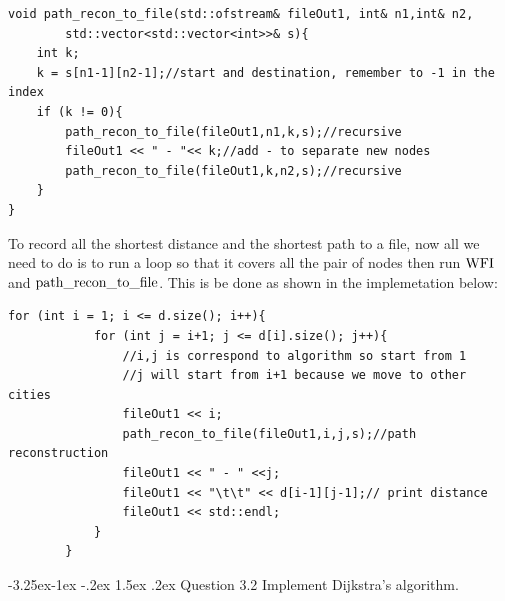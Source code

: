 \documentclass[a4paper,12pt]{article}%
\makeatletter
\renewcommand\subsection{\@startsection{subsection}{2}{\z@}%
                                     {-3.25ex\@plus -1ex \@minus -.2ex}%
                                     {1.5ex \@plus .2ex}%
                                     {\normalfont\bfseries}}
\makeatother
\begin{document}
\begin{lstlisting}[title = $\lstinline{path_recon_to_file}$]
void path_recon_to_file(std::ofstream& fileOut1, int& n1,int& n2, 
        std::vector<std::vector<int>>& s){
    int k;
    k = s[n1-1][n2-1];//start and destination, remember to -1 in the index
    if (k != 0){
        path_recon_to_file(fileOut1,n1,k,s);//recursive
        fileOut1 << " - "<< k;//add - to separate new nodes
        path_recon_to_file(fileOut1,k,n2,s);//recursive
    }
} 
\end{lstlisting}
To record all the shortest distance and the shortest path to a file, now all we need to do is to run a loop so that it covers all the pair of nodes then run $\lstinline{WFI}$ and $\lstinline{path_recon_to_file}$. This is be done as shown in the implemetation below:
\begin{lstlisting}
for (int i = 1; i <= d.size(); i++){
            for (int j = i+1; j <= d[i].size(); j++){
                //i,j is correspond to algorithm so start from 1
                //j will start from i+1 because we move to other cities
                fileOut1 << i;
                path_recon_to_file(fileOut1,i,j,s);//path reconstruction  
                fileOut1 << " - " <<j; 
                fileOut1 << "\t\t" << d[i-1][j-1];// print distance
                fileOut1 << std::endl;
            }           
        }
\end{lstlisting}
\subsection{Question 3.2}
Implement Dijkstra's algorithm.
\end{document}
